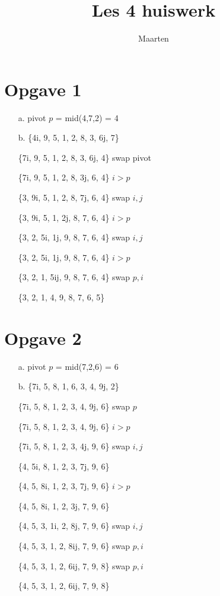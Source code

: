 \documentclass[12pt,a4paper]{article}
\title{Les 4 huiswerk}
\author{Maarten}
\begin{document}
\maketitle

\section{Opgave 1}
\begin{itemize}
\item[a.] pivot $p$ = mid(4,7,2) = 4
\item[b.] \{4i, 9, 5, 1, 2, 8, 3, 6j, 7\}
\item[] \{7i, 9, 5, 1, 2, 8, 3, 6j, 4\} swap pivot
\item[] \{7i, 9, 5, 1, 2, 8, 3j, 6, 4\} $i>p$
\item[] \{3, 9i, 5, 1, 2, 8, 7j, 6, 4\} swap $i,j$
\item[] \{3, 9i, 5, 1, 2j, 8, 7, 6, 4\} $i>p$
\item[] \{3, 2, 5i, 1j, 9, 8, 7, 6, 4\} swap $i,j$
\item[] \{3, 2, 5i, 1j, 9, 8, 7, 6, 4\} $i>p$
\item[] \{3, 2, 1, 5ij, 9, 8, 7, 6, 4\} swap $p,i$
\item[] \{3, 2, 1, 4, 9, 8, 7, 6, 5\}
\end{itemize}

\section{Opgave 2}
\begin{itemize}
\item[a.] pivot $p$ = mid(7,2,6) = 6
\item[b.] \{7i, 5, 8, 1, 6, 3, 4, 9j, 2\}
\item[] \{7i, 5, 8, 1, 2, 3, 4, 9j, 6\} swap $p$
\item[] \{7i, 5, 8, 1, 2, 3, 4, 9j, 6\} $i>p$
\item[] \{7i, 5, 8, 1, 2, 3, 4j, 9, 6\} swap $i,j$
\item[] \{4, 5i, 8, 1, 2, 3, 7j, 9, 6\}
\item[] \{4, 5, 8i, 1, 2, 3, 7j, 9, 6\} $i>p$
\item[] \{4, 5, 8i, 1, 2, 3j, 7, 9, 6\}
\item[] \{4, 5, 3, 1i, 2, 8j, 7, 9, 6\} swap $i,j$
\item[] \{4, 5, 3, 1, 2, 8ij, 7, 9, 6\} swap $p,i$
\item[] \{4, 5, 3, 1, 2, 6ij, 7, 9, 8\} swap $p,i$
\item[] \{4, 5, 3, 1, 2, 6ij, 7, 9, 8\}
\end{itemize}
\end{document}
